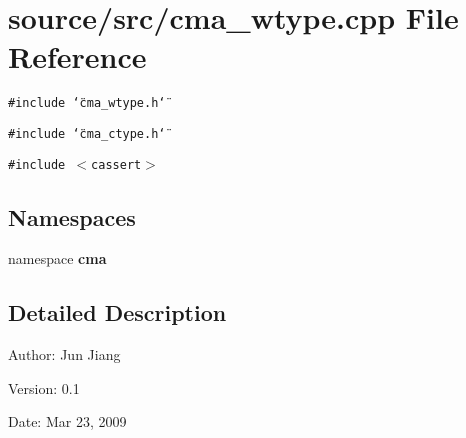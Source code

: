 \section{source/src/cma\_\-wtype.cpp File Reference}
\label{cma__wtype_8cpp}
{\tt \#include \char`\"{}cma\_\-wtype.h\char`\"{}}\par
{\tt \#include \char`\"{}cma\_\-ctype.h\char`\"{}}\par
{\tt \#include $<$cassert$>$}\par
\subsection*{Namespaces}
\begin{CompactItemize}
\item 
namespace \textbf{cma}
\end{CompactItemize}


\subsection{Detailed Description}
\begin{Desc}
\item[Author:]Jun Jiang \end{Desc}
\begin{Desc}
\item[Version:]0.1 \end{Desc}
\begin{Desc}
\item[Date:]Mar 23, 2009 \end{Desc}

